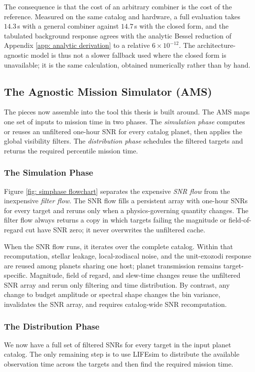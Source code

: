 \documentclass[12pt,a4paper]{article}
\numberwithin{equation}{section}
\numberwithin{figure}{section}
\numberwithin{table}{section}
\begin{document}
The consequence is that the cost of an arbitrary combiner is the cost of the reference. Measured on the same catalog and hardware, a full evaluation takes $14.3$\,s with a general combiner against $14.7$\,s with the closed form, and the tabulated background response agrees with the analytic Bessel reduction of Appendix \ref{app: analytic derivation} to a relative $6\times10^{-12}$. The architecture-agnostic model is thus not a slower fallback used where the closed form is unavailable; it is the same calculation, obtained numerically rather than by hand.

\subsection{The Agnostic Mission Simulator (AMS)} \label{sec: methods: AMS}
The pieces now assemble into the tool this thesis is built around. The AMS maps one set of inputs to mission time in two phases. The \textit{simulation phase} computes or reuses an unfiltered one-hour SNR for every catalog planet, then applies the global visibility filters. The \textit{distribution phase} schedules the filtered targets and returns the required percentile mission time.

\subsubsection{The Simulation Phase}
Figure \ref{fig: simphase flowchart} separates the expensive \textit{SNR flow} from the inexpensive \textit{filter flow}. The SNR flow fills a persistent array with one-hour SNRs for every target and reruns only when a physics-governing quantity changes. The filter flow always returns a copy in which targets failing the magnitude or field-of-regard cut have SNR zero; it never overwrites the unfiltered cache.

When the SNR flow runs, it iterates over the complete catalog. Within that recomputation, stellar leakage, local-zodiacal noise, and the unit-exozodi response are reused among planets sharing one host; planet transmission remains target-specific. Magnitude, field of regard, and slew-time changes reuse the unfiltered SNR array and rerun only filtering and time distribution. By contrast, any change to budget amplitude or spectral shape changes the bin variance, invalidates the SNR array, and requires catalog-wide SNR recomputation.

\subsubsection{The Distribution Phase}
We now have a full set of filtered SNRs for every target in the input planet catalog. The only remaining step is to use LIFEsim to distribute the available observation time across the targets and then find the required mission time.
\end{document}
